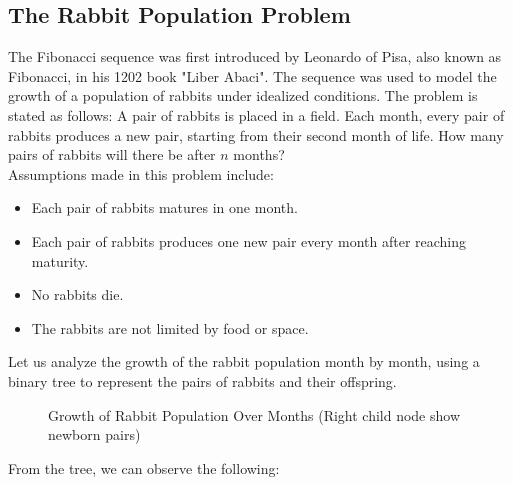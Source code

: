 \documentclass[openany]{book}
\begin{document}
\subsection{The Rabbit Population Problem}
The Fibonacci sequence was first introduced by Leonardo of Pisa, also known as Fibonacci, in his 1202 book "Liber Abaci". The sequence was used to model the growth of a population of rabbits under idealized conditions. The problem is stated as follows:
A pair of rabbits is placed in a field. Each month, every pair of rabbits produces a new pair, starting from their second month of life. How many pairs of rabbits will there be after $n$ months? \\
Assumptions made in this problem include:
\begin{itemize}
    \item Each pair of rabbits matures in one month.
    \item Each pair of rabbits produces one new pair every month after reaching maturity.
    \item No rabbits die.
    \item The rabbits are not limited by food or space.
\end{itemize}
Let us analyze the growth of the rabbit population month by month, using a binary tree to represent the pairs of rabbits and their offspring.
\begin{figure}[H]
    \centering
    \caption{Growth of Rabbit Population Over Months (Right child node show newborn pairs)}
    \label{fig:rabbit_population}
\end{figure}
From the tree, we can observe the following:
\end{document}
